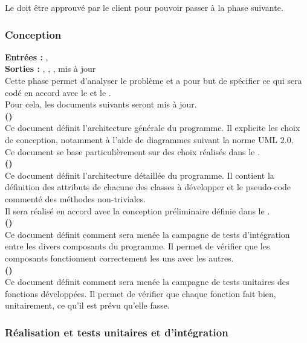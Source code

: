 Le \DSECourt{} doit être approuvé par le client pour pouvoir passer à la phase suivante. \\


\subsubsection{Conception}

\textbf{Entrées :} \DSECourt, \DSICourt \\
\textbf{Sorties :} \DCPCourt , \DCDCourt , \PTICourt , \PTUCourt{} mis à jour\\
Cette phase permet d’analyser le problème et a pour but de spécifier ce qui sera codé en accord avec le \DSECourt{} et le \DSICourt. \\
Pour cela, les documents suivants seront mis à jour. \\

\textbf{\DCP (\DCPCourt)} \\
Ce document définit l’architecture générale du programme. Il explicite les choix de conception, notamment à l’aide de diagrammes suivant la norme UML 2.0.\\ 
Ce document se base particulièrement sur des choix réalisés dans le \DSICourt. \\

\textbf{\DCD (\DCDCourt)} \\
Ce document définit l’architecture détaillée du programme. Il contient la définition des attributs de chacune des classes à développer et le pseudo-code commenté des méthodes non-triviales.\\
Il sera réalisé en accord avec la conception préliminaire définie dans le \DCPCourt.\\

\textbf{\PTI (\PTICourt)} \\
Ce document définit comment sera menée la campagne de tests d’intégration entre les divers composants du programme. Il permet de vérifier que les composants fonctionnent correctement les uns avec les autres.\\

\textbf{\PTU (\PTUCourt)} \\
Ce document définit comment sera menée la campagne de tests unitaires des fonctions développées. Il permet de vérifier que chaque fonction fait bien, unitairement, ce qu’il est prévu qu’elle fasse. \\


\subsubsection{Réalisation et tests unitaires et d’intégration}

